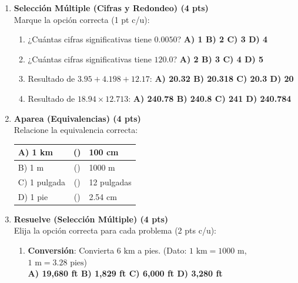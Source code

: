 \documentclass[a4paper,12pt]{article}
\begin{document}
\begin{enumerate}[label=\textbf{Item \arabic*:}, leftmargin=*]
    \item \textbf{Selección Múltiple (Cifras y Redondeo) (4 pts)} \\
    Marque la opción correcta (1 pt c/u):
    \begin{enumerate}[label=\roman*)]
        \item ¿Cuántas cifras significativas tiene $0.0050$? \textbf{A) 1 \quad B) 2 \quad C) 3 \quad D) 4}
        \item ¿Cuántas cifras significativas tiene $120.0$? \textbf{A) 2 \quad B) 3 \quad C) 4 \quad D) 5}
        \item Resultado de $3.95 + 4.198 + 12.17$: \textbf{A) 20.32 \quad B) 20.318 \quad C) 20.3 \quad D) 20}
        \item Resultado de $18.94 \times 12.713$: \textbf{A) 240.78 \quad B) 240.8 \quad C) 241 \quad D) 240.784}
    \end{enumerate}

    \item \textbf{Aparea (Equivalencias) (4 pts)} \\
    Relacione la equivalencia correcta:
    \begin{center}
    \begin{tabular}{|l|c|l|}
        \hline
        A) 1 km & (\hspace{0.5cm}) & 100 cm \\ \hline
        B) 1 m & (\hspace{0.5cm}) & 1000 m \\ \hline
        C) 1 pulgada & (\hspace{0.5cm}) & 12 pulgadas \\ \hline
        D) 1 pie & (\hspace{0.5cm}) & 2.54 cm \\ \hline
    \end{tabular}
    \end{center}

    \item \textbf{Resuelve (Selección Múltiple) (4 pts)} \\
    Elija la opción correcta para cada problema (2 pts c/u):
    \begin{enumerate}[label=\Alph*)]
        \item \textbf{Conversión}: Convierta $6 \text{ km}$ a pies. (Dato: $1 \text{ km} = 1000 \text{ m}$, $1 \text{ m} = 3.28 \text{ pies}$) \\
        \textbf{A) 19,680 ft \quad B) 1,829 ft \quad C) 6,000 ft \quad D) 3,280 ft}
        

\end{enumerate}
\end{enumerate}
\end{document}
